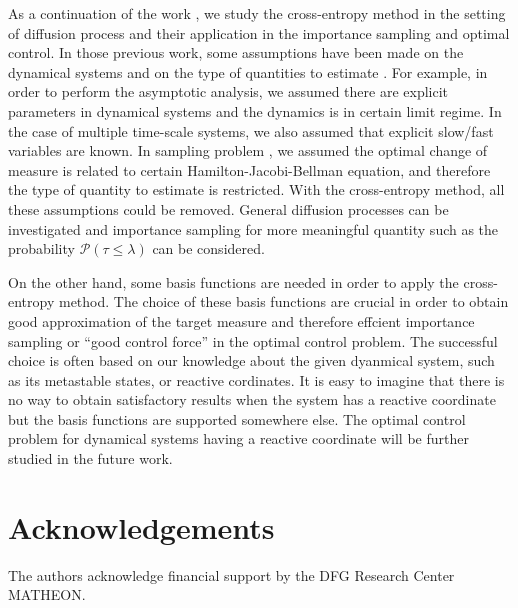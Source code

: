 \documentclass[final]{siamltex}
\begin{document}
As a continuation of the work \cite{zlph2013, zhws13}, we study the cross-entropy
method in the setting of diffusion process and their application in the
importance sampling and optimal control.
In those previous work, some assumptions have been made on the dynamical systems and
on the type of quantities to estimate \cite{zhws13}. For example, 
in order to perform the asymptotic analysis, we assumed there are explicit parameters in dynamical systems and the dynamics
is in certain limit regime. In the case of multiple time-scale systems, we
also assumed that explicit slow/fast variables are known. In sampling problem \cite{zhws13}, we assumed 
the optimal change of measure is related to certain Hamilton-Jacobi-Bellman equation,
and therefore the type of quantity to estimate is restricted. With the
cross-entropy method, all these assumptions could be removed. General
diffusion processes can be investigated and importance sampling for more
meaningful quantity such as the probability $\mathcal{P}(\tau \le \lambda)$ can be considered.

On the other hand, some basis functions are needed in order to apply the
cross-entropy method. The choice of these basis functions are crucial in order
to obtain good approximation of the target measure and therefore effcient
importance sampling or ``good control force'' in the optimal control problem.
The successful choice is often based on our knowledge about the given dyanmical
system, such as its metastable states, or reactive cordinates. It is easy to
imagine that there is no way to obtain satisfactory results when the system
has a reactive coordinate but the basis functions are supported somewhere else.
The optimal control problem for dynamical systems having a reactive coordinate
will be further studied in the future work.

\section*{Acknowledgements}
The authors acknowledge financial support by the DFG Research Center MATHEON.
\FloatBarrier



\end{document}

